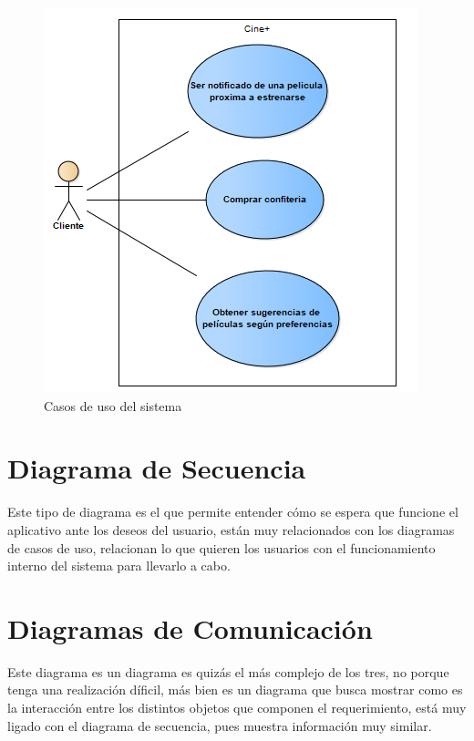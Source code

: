 \begin{figure}[h!]
	\centering
\includegraphics[width=.6\linewidth]{diseno/requerimientos/imgs/casosUso2}
	\caption{Casos de uso del sistema}
\end{figure}


\section{Diagrama de Secuencia}
Este tipo de diagrama es el que permite entender cómo se espera que funcione el aplicativo ante los deseos del usuario, están muy relacionados con los diagramas de casos de uso, relacionan lo que quieren los usuarios con el funcionamiento interno del sistema para llevarlo a cabo.



\section{Diagramas de Comunicación}
Este diagrama es un diagrama es quizás el más complejo de los tres, no porque tenga una realización díficil, más bien es un diagrama que busca mostrar como es la interacción entre los distintos objetos que componen el requerimiento, está muy ligado con el diagrama de secuencia, pues muestra información muy similar.